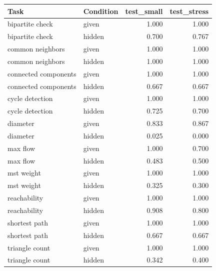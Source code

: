 \begin{tabular}{llrr}
\toprule
Task & Condition & test\_small & test\_stress \\
\midrule
bipartite check & given & 1.000 & 1.000 \\
bipartite check & hidden & 0.700 & 0.767 \\
common neighbors & given & 1.000 & 1.000 \\
common neighbors & hidden & 1.000 & 1.000 \\
connected components & given & 1.000 & 1.000 \\
connected components & hidden & 0.667 & 0.667 \\
cycle detection & given & 1.000 & 1.000 \\
cycle detection & hidden & 0.725 & 0.700 \\
diameter & given & 0.833 & 0.867 \\
diameter & hidden & 0.025 & 0.000 \\
max flow & given & 1.000 & 0.700 \\
max flow & hidden & 0.483 & 0.500 \\
mst weight & given & 1.000 & 1.000 \\
mst weight & hidden & 0.325 & 0.300 \\
reachability & given & 1.000 & 1.000 \\
reachability & hidden & 0.908 & 0.800 \\
shortest path & given & 1.000 & 1.000 \\
shortest path & hidden & 0.667 & 0.667 \\
triangle count & given & 1.000 & 1.000 \\
triangle count & hidden & 0.342 & 0.400 \\
\bottomrule
\end{tabular}
